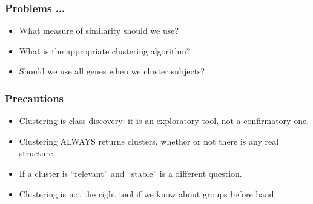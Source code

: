 










\begin{frame}
\frametitle{Problems ...}
\begin{itemize}
\item What measure of similarity should we use?
\item What is the appropriate clustering algorithm?
\item Should we use all genes when we cluster subjects?
\end{itemize}
\end{frame}



\begin{frame}
\frametitle{Precautions}
\begin{itemize}
\item Clustering is class discovery: it is an exploratory tool, not a
  confirmatory one.
  
\item Clustering ALWAYS returns clusters, whether or not there is any real
  structure. 
\item If a cluster is ``relevant'' and ``stable'' is a different question.
\item Clustering is not the right tool if we know about groups before hand.
\end{itemize}
\end{frame}


